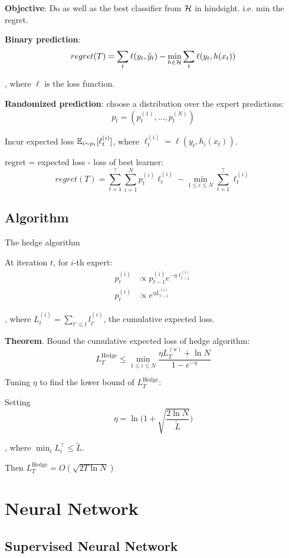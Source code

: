 \documentclass[a4paper]{report}
\begin{document}
\textbf{Objective}: Do as well as the best classifier from $\mathcal{H}$ in hindsight. i.e. min the regret. 

\textbf{Binary prediction}:
$$
regret(T) = \sum_t \ell(y_t, \hat y_t) - \min_{h\in \mathcal{H}} \sum_t \ell(y_t, h(x_t))
$$

, where $\ell$ is the loss function. 

\textbf{Randomized prediction}: choose a distribution over the expert predictions: $$
p_t = (p_t^{(1)},...,p_t^{(N)})
$$

Incur expected loss $\mathbb{E}_{i\sim p_t}[\ell_t^{(i)}]$, where $\ell_t^{(i)}=\ell(y_t, h_i(x_t))$.

regret = expected loss - loss of best learner: 
$$
regret(T) = \sum_{t=1}^\top \sum_{i=1}^N p_t^{(i)}\ell_t^{(i)} - \min_{1\leq i \leq N}\sum_{t=1}^\top\ell_t^{(i)}
$$

\section{Algorithm}
The hedge algorithm

At iteration $t$, for $i$-th expert:
\begin{align*}
p_t^{(i)} &\propto p_{t-1}^{(i)} e^{-\eta \ell_{t-1}^{(i)}} \\
p_t^{(i)} &\propto e^{\eta L_{t-1}^{(i)}}
\end{align*}

, where $L^{(i)}_t = \sum_{t'\leq t} l^{(i)}_{t'}$, the cumulative expected loss. 

\textbf{Theorem}. Bound the cumulative expected loss of hedge algorithm:
$$
L^\text{Hedge}_T\leq \min_{1\leq i \leq N} \frac{\eta L^{(u)}_T+\ln N}{1-e^{-\eta}}
$$

Tuning $\eta$ to find the lower bound of $L^\text{Hedge}_T$:

Setting 
$$
\eta = \ln \Bigg(1+\sqrt{\frac{2\ln N}{\tilde L}}\Bigg)
$$

, where $\min_i L_i^\top \leq \tilde L $. 

Then $L_T^\text{Hedge}=O(\sqrt{2T\ln N})$

\chapter{Neural Network}

\section{Supervised Neural Network}
\end{document}
